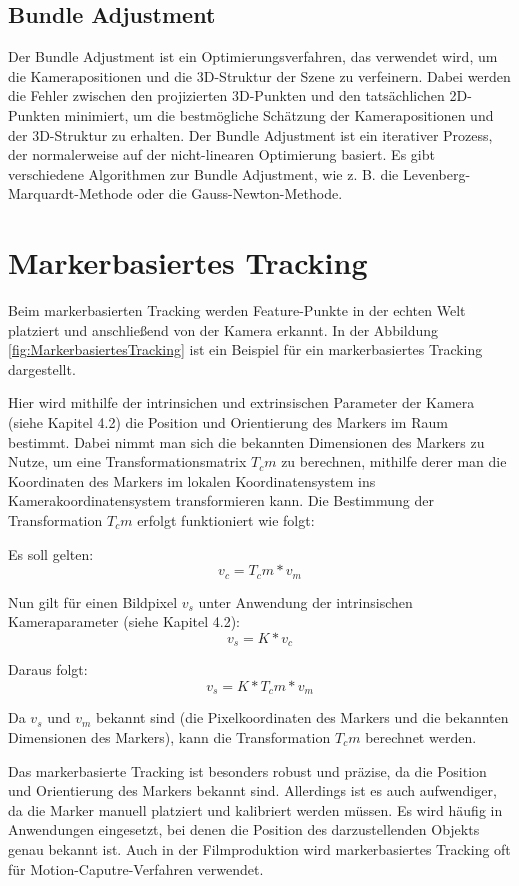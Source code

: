 \subsection{Bundle Adjustment}

Der Bundle Adjustment ist ein Optimierungsverfahren, das verwendet wird, um die Kamerapositionen und die 3D-Struktur der Szene zu verfeinern. Dabei werden die Fehler zwischen den projizierten 3D-Punkten und den tatsächlichen 2D-Punkten minimiert, um die bestmögliche Schätzung der Kamerapositionen und der 3D-Struktur zu erhalten. Der Bundle Adjustment ist ein iterativer Prozess, der normalerweise auf der nicht-linearen Optimierung basiert. Es gibt verschiedene Algorithmen zur Bundle Adjustment, wie z. B. die Levenberg-Marquardt-Methode oder die Gauss-Newton-Methode.

\section{Markerbasiertes Tracking}

Beim markerbasierten Tracking werden Feature-Punkte in der echten Welt platziert und anschließend von der Kamera erkannt. In der Abbildung \ref{fig:MarkerbasiertesTracking} ist ein Beispiel für ein markerbasiertes Tracking dargestellt. 

Hier wird mithilfe der intrinsichen und extrinsischen Parameter der Kamera (siehe Kapitel 4.2) die Position und Orientierung des Markers im Raum bestimmt. Dabei nimmt man sich die bekannten Dimensionen des Markers zu Nutze, um eine Transformationsmatrix \(T_cm\) zu berechnen, mithilfe derer man die Koordinaten des Markers im lokalen Koordinatensystem ins Kamerakoordinatensystem transformieren kann. Die Bestimmung der Transformation \(T_cm\) erfolgt funktioniert wie folgt:

Es soll gelten:
\[ v_c = T_cm * v_m \]

Nun gilt für einen Bildpixel \(v_s\) unter Anwendung der intrinsischen Kameraparameter (siehe Kapitel 4.2):
\[ v_s = K * v_c \]

Daraus folgt:
\[ v_s = K * T_cm * v_m \]

Da \(v_s\) und \(v_m\) bekannt sind (die Pixelkoordinaten des Markers und die bekannten Dimensionen des Markers), kann die Transformation \(T_cm\) berechnet werden.

Das markerbasierte Tracking ist besonders robust und präzise, da die Position und Orientierung des Markers bekannt sind. Allerdings ist es auch aufwendiger, da die Marker manuell platziert und kalibriert werden müssen. Es wird häufig in Anwendungen eingesetzt, bei denen die Position des darzustellenden Objekts genau bekannt ist. Auch in der Filmproduktion wird markerbasiertes Tracking oft für Motion-Caputre-Verfahren verwendet.

